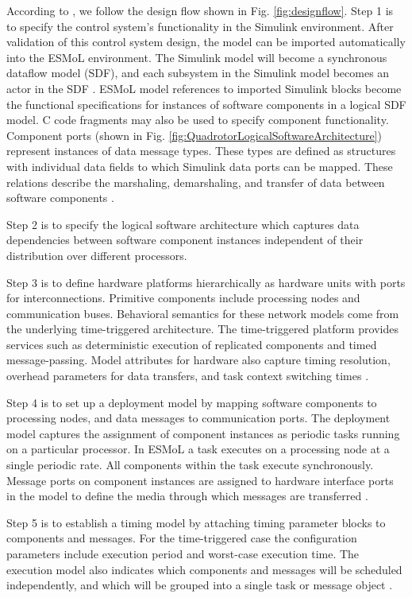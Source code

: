 \documentclass{acm_proc_article-sp}
\begin{document}
According to \cite{modeling:esmol}, we follow the design flow shown in Fig. \ref{fig:designflow}. Step 1 is to specify the control system's functionality in the Simulink environment. After validation of this control system design, the model can be imported automatically into the ESMoL environment. The Simulink model will become a synchronous dataflow model (SDF), and each subsystem in the Simulink model becomes an actor in the SDF \cite{moc:sdf}. ESMoL model references to imported Simulink blocks become the functional specifications for instances of software components in a logical SDF model. C code fragments may also be used to specify component functionality. Component ports (shown in Fig. \ref{fig:QuadrotorLogicalSoftwareArchitecture}) represent instances of data message types. These types are defined as structures with individual data fields to which Simulink data ports can be mapped. These relations describe the marshaling, demarshaling, and transfer of data between software components \cite{modeling:esmol}.

Step 2 is to specify the logical software architecture which captures data dependencies between software component instances independent of their distribution over different processors.

Step 3 is to define hardware platforms hierarchically as hardware units with ports for interconnections. Primitive components include processing nodes and communication buses. Behavioral semantics for these network models come from the underlying time-triggered architecture. The time-triggered platform provides services such as deterministic execution of replicated components and timed message-passing. Model attributes for hardware also capture timing resolution, overhead parameters for data transfers, and task context switching times \cite{modeling:esmol}.

Step 4 is to set up a deployment model by mapping software components to processing nodes, and data messages to communication ports. The deployment model captures the assignment of component instances as periodic tasks running on a particular processor. In ESMoL a task executes on a processing node at a single periodic rate. All components within the task execute synchronously. Message ports on component instances are assigned to hardware interface ports in the model to define the media through which messages are transferred \cite{modeling:esmol}.

Step 5 is to establish a timing model by attaching timing parameter blocks to components and messages. For the time-triggered case the configuration parameters include execution period and worst-case execution time. The execution model also indicates which components and messages will be scheduled independently, and which will be grouped into a single task or message object \cite{modeling:esmol}.
\end{document}
